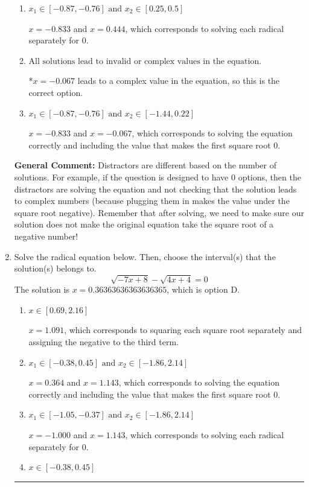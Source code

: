 \documentclass{extbook}[14pt]
\newcommand{\litem}[1]{\item #1

\rule{\textwidth}{0.4pt}}
\begin{document}
\begin{enumerate}
{\begin{enumerate}[label=\Alph*.]
$x = -0.600$, which corresponds to squaring each square root separately and assigning the negative to the third term.
\item \( x_1 \in [-0.87, -0.76] \text{ and } x_2 \in [0.25,0.5] \)

$x = -0.833$ and $x = 0.444$, which corresponds to solving each radical separately for 0.
\item \( \text{All solutions lead to invalid or complex values in the equation.} \)

*$x = -0.067$ leads to a complex value in the equation, so this is the correct option.
\item \( x_1 \in [-0.87, -0.76] \text{ and } x_2 \in [-1.44,0.22] \)

$x = -0.833$ and $x = -0.067$, which corresponds to solving the equation correctly and including the value that makes the first square root 0.
\end{enumerate}

\textbf{General Comment:} Distractors are different based on the number of solutions. For example, if the question is designed to have 0 options, then the distractors are solving the equation and not checking that the solution leads to complex numbers (because plugging them in makes the value under the square root negative). Remember that after solving, we need to make sure our solution does not make the original equation take the square root of a negative number!
}
\litem{
Solve the radical equation below. Then, choose the interval(s) that the solution(s) belongs to.
\[ \sqrt{-7 x + 8} - \sqrt{4 x + 4} = 0 \]The solution is \( x = 0.36363636363636365 \), which is option D.\begin{enumerate}[label=\Alph*.]
\item \( x \in [0.69,2.16] \)

$x = 1.091$, which corresponds to squaring each square root separately and assigning the negative to the third term.
\item \( x_1 \in [-0.38, 0.45] \text{ and } x_2 \in [-1.86,2.14] \)

$x = 0.364$ and $x = 1.143$, which corresponds to solving the equation correctly and including the value that makes the first square root 0.
\item \( x_1 \in [-1.05, -0.37] \text{ and } x_2 \in [-1.86,2.14] \)

$x = -1.000$ and $x = 1.143$, which corresponds to solving each radical separately for 0.
\item \( x \in [-0.38,0.45] \)


\end{enumerate}}
\end{enumerate}
\end{document}
